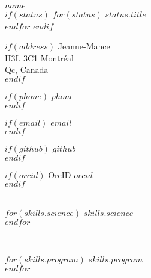 \documentclass[$fontsize$, letterpaper]{article}
\begin{document}
{\Large \textbf{$name$}}\\[.2cm]
$if(status)$
$for(status)$
{\large{$status.title$}}\\
$endfor$
$endif$

\setlength{\columnsep}{-2cm}
\begin{multicols}{2}

$if(address)$
\faHome {} Jeanne-Mance \\ \hspace*{.6cm} H3L 3C1 Montréal \\ \hspace*{.6cm} Qc, Canada\\
$endif$

\vspace{-15pt}

$if(phone)$
\faPhone \quad $phone$\\
$endif$

\vspace{-15pt}

$if(email)$
\faEnvelope \quad \href{mailto:$email$}{$email$}\\
$endif$

\vspace{-15pt}

$if(github)$
\faGithub \quad \href{https://github.com/$github$}{$github$}\\
$endif$

\vspace*{-15pt}

$if(orcid)$
OrcID \quad \href{http://orcid.org/$orcid$}{$orcid$}\\
$endif$




\columnbreak

\vspace{2cm}

\setlength{\columnsep}{-1cm}
\begin{multicols}{2}


\\

$for(skills.science)$
$skills.science$\\
$endfor$


\columnbreak

\vspace{-.2cm}

\\

\vspace{-.08cm}

$for(skills.program)$
$skills.program$\\
$endfor$


\end{multicols}
\end{multicols}
\end{document}
